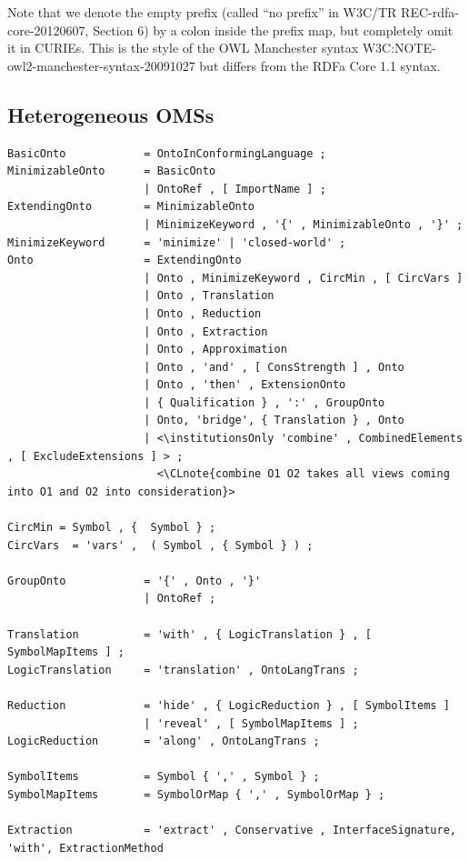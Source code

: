 \documentclass[10pt,%
\ifpretendfinal
final%
\else
draft%
\fi,
]{scrreprt}
\makeatletter
\newcommand*\CommentAuthor{}
\renewcommand*\CommentAuthor{#1}}
\newcommand*\CommentDate{}
\renewcommand*\CommentDate{#1}}
\newcommand*\CommentId{}
\renewcommand*\CommentId{#1}}
\newcommand*\CommentType{}
\renewcommand*\CommentType{#1}}
\newcommand*{\SetCommentColorByType}[1]{%
\edef\localType{{#1}}%
\expandafter\ifstrequal\localType{q-aut}{\colorlet{CommentColor}{red}}{%
\expandafter\ifstrequal\localType{q-all}{\colorlet{CommentColor}{orange}}{%
\expandafter\ifstrequal\localType{todo}{\colorlet{CommentColor}{orange}}{%
\expandafter\ifstrequal\localType{fyi}{\colorlet{CommentColor}{lightgray}}{%
\colorlet{CommentColor}{yellow}}}}}}
\newcommand*{\SetCommentPrefixByType}[1]{%
\edef\localType{{#1}}%
\expandafter\@ifmtarg\localType{%
\edef\CommentPrefix{}%
}{%
\caseupper[q]{#1}%
\edef\CommentPrefix{\thestring: }%
}}
\newcommand*{\initComment}[1]{%
\setkeys{Comment}{#1}%
\SetCommentColorByType{\CommentType}%
\relax%
\SetCommentPrefixByType{\CommentType}%
\relax%
}
\newcommand*{\todonote}[2][]{%
\initComment{#1}%
\pdfcomment[author=\CommentAuthor,color=CommentColor,date=\CommentDate,id=\CommentId]{%
\CommentPrefix
#2}}
\renewcommand*{\todonote}[2][]{%
\initComment{#1}%
\ednote{\CommentPrefix #2}}
\newcommand*{\CLnote}[2][author=Christoph Lange]{%
\todonote[author=Christoph Lange,#1]{#2} 
}
\newcommand*{\institutionsOnly}{\bfseries\itshape}
\newcommand{\bref}[1]{[\ref{#1}]}
\newcommand{\ssclause}[1]{\subsection{#1}}
\newcommand{\nisref}[1]{#1}
\renewcommand{\bref}[1]{#1}
\makeatother
\begin{document}
Note that we denote the empty prefix (called ``no prefix'' in \nisref{W3C/TR REC-rdfa-core-20120607, Section 6}) by a colon inside the prefix map, but completely omit it in CURIEs.  This is the style of the OWL Manchester syntax \bref{W3C:NOTE-owl2-manchester-syntax-20091027} but differs from the RDFa Core 1.1 syntax.

\ssclause{Heterogeneous OMSs}\label{a:dol-text:OMSs}


\begin{lstlisting}[language=ebnf,escapeinside={<>}]
BasicOnto            = OntoInConformingLanguage ;
MinimizableOnto      = BasicOnto
                     | OntoRef , [ ImportName ] ; 
ExtendingOnto        = MinimizableOnto
                     | MinimizeKeyword , '{' , MinimizableOnto , '}' ;
MinimizeKeyword      = 'minimize' | 'closed-world' ;
Onto                 = ExtendingOnto
                     | Onto , MinimizeKeyword , CircMin , [ CircVars ]
                     | Onto , Translation
                     | Onto , Reduction
                     | Onto , Extraction
                     | Onto , Approximation
                     | Onto , 'and' , [ ConsStrength ] , Onto 
                     | Onto , 'then' , ExtensionOnto
                     | { Qualification } , ':' , GroupOnto
                     | Onto, 'bridge', { Translation } , Onto
                     | <\institutionsOnly 'combine' , CombinedElements , [ ExcludeExtensions ] > ;
                       <\CLnote{combine O1 O2 takes all views coming into O1 and O2 into consideration}>

CircMin = Symbol , {  Symbol } ;
CircVars  = 'vars' ,  ( Symbol , { Symbol } ) ;

GroupOnto            = '{' , Onto , '}'
                     | OntoRef ;

Translation          = 'with' , { LogicTranslation } , [ SymbolMapItems ] ;
LogicTranslation     = 'translation' , OntoLangTrans ;
                      
Reduction            = 'hide' , { LogicReduction } , [ SymbolItems ]
                     | 'reveal' , [ SymbolMapItems ] ;
LogicReduction       = 'along' , OntoLangTrans ;

SymbolItems          = Symbol { ',' , Symbol } ;
SymbolMapItems       = SymbolOrMap { ',' , SymbolOrMap } ;

Extraction           = 'extract' , Conservative , InterfaceSignature, 'with', ExtractionMethod


\end{lstlisting}
\end{document}
